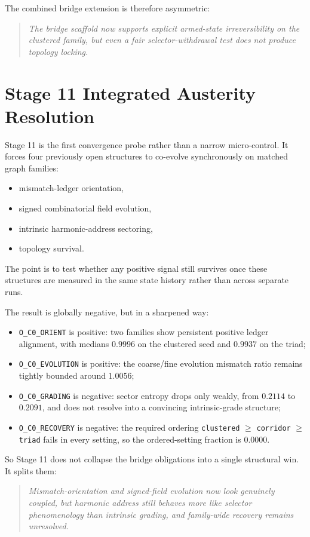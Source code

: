 \documentclass[11pt]{article}
\begin{document}
The combined bridge extension is therefore asymmetric:
\begin{quote}
\emph{The bridge scaffold now supports explicit armed-state irreversibility on the clustered family, but even a fair selector-withdrawal test does not produce topology locking.}
\end{quote}

\section{Stage 11 Integrated Austerity Resolution}

Stage 11 is the first convergence probe rather than a narrow micro-control. It forces four previously open structures to co-evolve synchronously on matched graph families:
\begin{itemize}
\item mismatch-ledger orientation,
\item signed combinatorial field evolution,
\item intrinsic harmonic-address sectoring,
\item topology survival.
\end{itemize}
The point is to test whether any positive signal still survives once these structures are measured in the same state history rather than across separate runs.

The result is globally negative, but in a sharpened way:
\begin{itemize}
\item \texttt{O\_C0\_ORIENT} is positive: two families show persistent positive ledger alignment, with medians $0.9996$ on the clustered seed and $0.9937$ on the triad;
\item \texttt{O\_C0\_EVOLUTION} is positive: the coarse/fine evolution mismatch ratio remains tightly bounded around $1.0056$;
\item \texttt{O\_C0\_GRADING} is negative: sector entropy drops only weakly, from $0.2114$ to $0.2091$, and does not resolve into a convincing intrinsic-grade structure;
\item \texttt{O\_C0\_RECOVERY} is negative: the required ordering \texttt{clustered} $\ge$ \texttt{corridor} $\ge$ \texttt{triad} fails in every setting, so the ordered-setting fraction is $0.0000$.
\end{itemize}

So Stage 11 does not collapse the bridge obligations into a single structural win. It splits them:
\begin{quote}
\emph{Mismatch-orientation and signed-field evolution now look genuinely coupled, but harmonic address still behaves more like selector phenomenology than intrinsic grading, and family-wide recovery remains unresolved.}
\end{quote}
\end{document}
